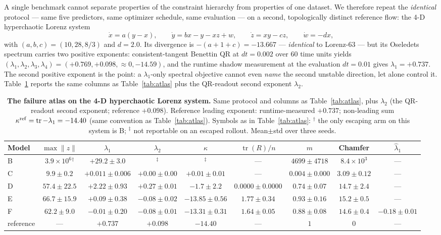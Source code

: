 \documentclass[11pt]{article}
\newcommand{\tr}{\operatorname{tr}}
\begin{document}
A single benchmark cannot separate properties of the constraint
hierarchy from properties of one dataset. We therefore repeat the
\emph{identical} protocol --- same five predictors, same optimizer
schedule, same evaluation --- on a second, topologically distinct
reference flow: the 4-D hyperchaotic Lorenz system \cite{qi2008hyperchaos}
\begin{equation}
\label{eq:lz4}
\dot x=a(y-x),\qquad\dot y=bx-y-xz+w,\qquad\dot z=xy-cz,\qquad\dot w=-dx,
\end{equation}
with $(a,b,c)=(10,28,8/3)$ and $d=2.0$. Its divergence is
$-(a+1+c)=-13.667$ --- \emph{identical} to Lorenz-63 --- but its
Oseledets spectrum carries two positive exponents: consistent-tangent
Benettin QR at $dt=0.002$ over 60 time units yields
$(\lambda_1,\lambda_2,\lambda_3,\lambda_4)=(+0.769,+0.098,\approx0,-14.59)$,
and the runtime shadow measurement at the evaluation $dt=0.01$ gives
$\lambda_1=+0.737$. The second positive exponent is the point: a
$\lambda_1$-only spectral objective cannot even \emph{name} the second
unstable direction, let alone control it. Table~\ref{tab:lz4} reports the
same columns as Table~\ref{tab:atlas} plus the QR-readout second
exponent $\lambda_2$.

\begin{table}[t]
\centering
\caption{\textbf{The failure atlas on the 4-D hyperchaotic Lorenz
system.} Same protocol and columns as Table~\ref{tab:atlas}, plus
$\lambda_2$ (the QR-readout second exponent; reference $+0.098$).
Reference leading exponent: runtime-measured $+0.737$; non-leading sum
$\kappa^{\rm ref}=\tr-\lambda_1=-14.40$ (same convention as
Table~\ref{tab:atlas}). Symbols as in Table~\ref{tab:atlas}:
${}^\dagger$ the only escaping arm on this system is B;
${}^\ddagger$ not reportable on an escaped rollout. Mean$\pm$std over
three seeds.}
\label{tab:lz4}
\begingroup\scriptsize\setlength{\tabcolsep}{2pt}
\begin{tabular}{lcccccccc}
\toprule
Model & $\max\|z\|$ & $\lambda_1$ & $\lambda_2$ & $\kappa$ & $\tr(R)/n$ & $m$ & Chamfer & $\hat\lambda_1$ \\
\midrule
B & $3.9{\times}10^6{}^{\dagger}$ & $+29.2\pm3.0$ & ${}^{\ddagger}$ & ${}^{\ddagger}$ & --- & $4699\pm4718$ & $8.4{\times}10^3$ & --- \\
C & $9.9\pm0.2$ & $+0.011\pm0.006$ & $+0.00\pm0.00$ & $+0.01\pm0.01$ & --- & $0.004\pm0.000$ & $3.09\pm0.12$ & --- \\
D & $57.4\pm22.5$ & $+2.22\pm0.93$ & $+0.27\pm0.01$ & $-1.7\pm2.2$ & $0.0000\pm0.0000$ & $0.74\pm0.07$ & $14.7\pm2.4$ & --- \\
E & $66.7\pm15.9$ & $+0.09\pm0.38$ & $-0.08\pm0.02$ & $-13.85\pm0.56$ & $1.77\pm0.34$ & $0.93\pm0.16$ & $15.2\pm0.5$ & --- \\
F & $62.2\pm9.0$ & $-0.01\pm0.20$ & $-0.08\pm0.01$ & $-13.31\pm0.31$ & $1.64\pm0.05$ & $0.88\pm0.08$ & $14.6\pm0.4$ & $-0.18\pm0.01$ \\
\midrule
reference & --- & $+0.737$ & $+0.098$ & $-14.40$ & --- & $1$ & $0$ & --- \\
\bottomrule
\end{tabular}
\endgroup
\end{table}
\end{document}
